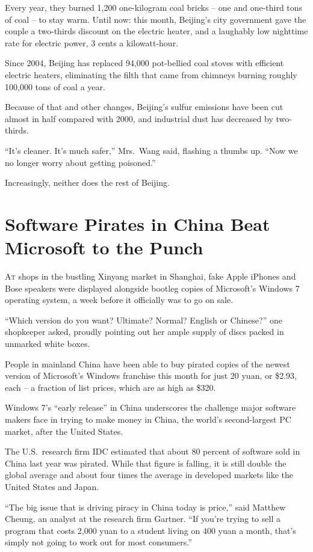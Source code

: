 ﻿\documentclass[12pt]{article}
\begin{document}
Every year, they burned 1,200 one-kilogram coal bricks -- one and one-third tons of coal -- to stay
warm. Until now: this month, Beijing's city government gave the couple a two-thirds discount on the
electric heater, and a laughably low nighttime rate for electric power, 3 cents a kilowatt-hour.

Since 2004, Beijing has replaced 94,000 pot-bellied coal stoves with efficient electric heaters,
eliminating the filth that came from chimneys burning roughly 100,000 tons of coal a year.

Because of that and other changes, Beijing's sulfur emissions have been cut almost in half compared
with 2000, and industrial dust has decreased by two-thirds.

``It's cleaner. It's much safer,'' Mrs.~Wang said, flashing a thumbs up. ``Now we no longer worry
about getting poisoned.''

Increasingly, neither does the rest of Beijing.

\section{Software Pirates in China Beat Microsoft to the Punch}

\lettrine{A}{t} shops in the bustling Xinyang market in Shanghai, fake Apple
iPhones and Bose speakers were displayed alongside bootleg copies of Microsoft's Windows 7 operating
system, a week before it officially was to go on sale.

``Which version do you want? Ultimate? Normal? English or Chinese?'' one shopkeeper asked, proudly
pointing out her ample supply of discs packed in unmarked white boxes.

People in mainland China have been able to buy pirated copies of the newest version of Microsoft's
Windows franchise this month for just 20 yuan, or \$2.93, each -- a fraction of list prices, which
are as high as \$320.

Windows 7's ``early release'' in China underscores the challenge major software makers face in
trying to make money in China, the world's second-largest PC market, after the United States.

The U.S.~research firm IDC estimated that about 80 percent of software sold in China last year was
pirated. While that figure is falling, it is still double the global average and about four times
the average in developed markets like the United States and Japan.

``The big issue that is driving piracy in China today is price,'' said Matthew Cheung, an analyst at
the research firm Gartner. ``If you're trying to sell a program that costs 2,000 yuan to a student
living on 400 yuan a month, that's simply not going to work out for most consumers.''
\end{document}
